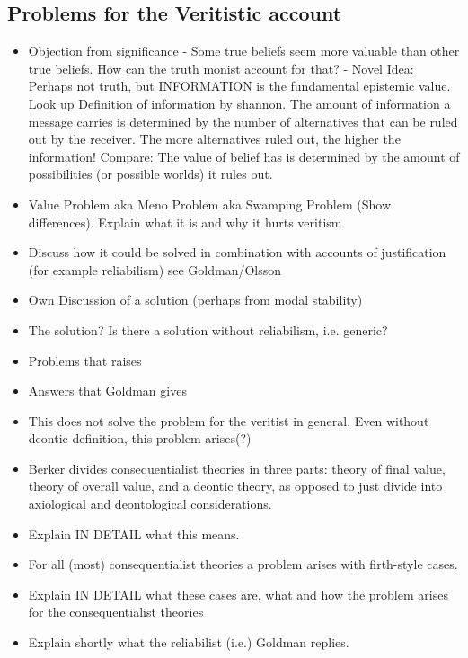 \documentclass[12pt,numbers=noenddot]{scrartcl}
\begin{document}
\subsection{Problems for the Veritistic account}
\begin{itemize}
    \item Objection from significance - Some true beliefs seem more valuable than other true beliefs. How can the truth monist account for that? - Novel Idea: Perhaps not truth, but INFORMATION is the fundamental epistemic value. Look up Definition of information by shannon. The amount of information a message carries is determined by the number of alternatives that can be ruled out by the receiver. The more alternatives ruled out, the higher the information! Compare: The value of belief has is determined by the amount of possibilities (or possible worlds) it rules out.
    \item Value Problem aka Meno Problem aka Swamping Problem (Show differences). Explain what it is and why it hurts veritism 
    \item Discuss how it could be solved in combination with accounts of justification (for example reliabilism) see Goldman/Olsson
    \item Own Discussion of a solution (perhaps from modal stability)
    \item The solution? Is there a solution without reliabilism, i.e. generic?
\end{itemize}
\begin{itemize}
    \item Problems that \textcite{Berker2013-BERETA-2} raises
    \item Answers that Goldman gives
    \item This does not solve the problem for the veritist in general. Even without deontic definition, this problem arises(?)
    \item Berker divides consequentialist theories in three parts: theory of final value, theory of overall value, and a deontic theory, as opposed to just divide into axiological and deontological considerations. 
    \item Explain IN DETAIL what this means. 
    \item For all (most) consequentialist theories a problem arises with firth-style cases. 
    \item Explain IN DETAIL what these cases are, what and how the problem arises for the consequentialist theories
    \item Explain shortly what the reliabilist (i.e.) Goldman replies.  
\end{itemize}
\end{document}

